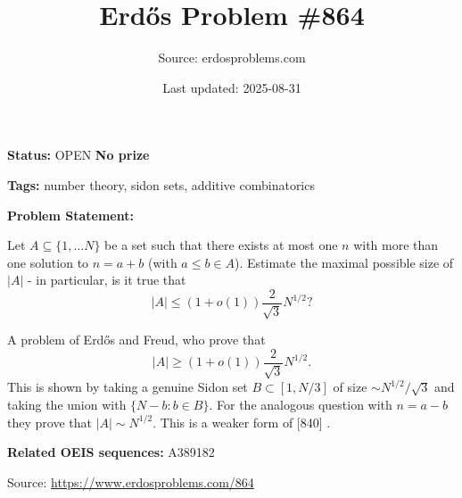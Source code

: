 \documentclass{article}
\title{Erd\H{o}s Problem \#864}
\date{Last updated: 2025-08-31}
\author{Source: erdosproblems.com}
\begin{document}
\maketitle

\noindent\textbf{Status:} OPEN \quad \textbf{No prize}

\noindent\textbf{Tags:} number theory, sidon sets, additive combinatorics

\medskip

\noindent\textbf{Problem Statement:}

Let $A\subseteq \{1,\ldots N\}$ be a set such that there exists at most one $n$ with more than one solution to $n=a+b$ (with $a\leq b\in A$). Estimate the maximal possible size of $\lvert A\rvert$ - in particular, is it true that\[\lvert A\rvert \leq (1+o(1))\frac{2}{\sqrt{3}}N^{1/2}?\]




A problem of Erd\H{o}s and Freud, who prove that\[\lvert A\rvert \geq (1+o(1))\frac{2}{\sqrt{3}}N^{1/2}.\]This is shown by taking a genuine Sidon set $B\subset [1,N/3]$ of size $\sim N^{1/2}/\sqrt{3}$ and taking the union with $\{N-b : b\in B\}$. For the analogous question with $n=a-b$ they prove that $\lvert A\rvert\sim N^{1/2}$. This is a weaker form of [840] .

\noindent\textbf{Related OEIS sequences:} A389182


\bigskip
\noindent\small{Source: \url{https://www.erdosproblems.com/864}}
\end{document}
